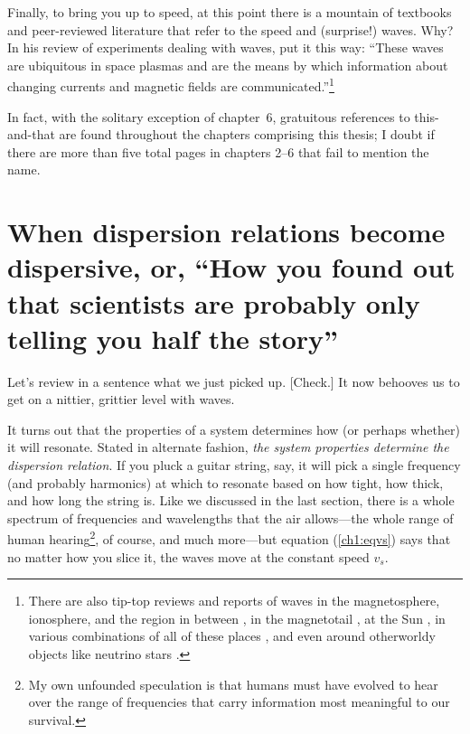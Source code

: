 Finally, to bring you up to speed, at this point there is a mountain
of textbooks and peer-reviewed literature that refer to the \Alf speed
and (surprise!) \Alf waves. Why? In his review of experiments dealing
with \Alf waves, \cite{Gekelman1999} put it this way: ``These waves
are ubiquitous in space plasmas and are the means by which information
about changing currents and magnetic fields are
communicated.''\footnote{There are also tip-top reviews and reports of
  \Alf waves in the magnetosphere, ionosphere, and the region in
  between \citep{Stasiewicz2000,Berthomier2011,Mottez2015}, in the
  magnetotail \citep{Keiling2009}, at the Sun
  \citep{Mathioudakis2013}, in various combinations of all of these
  places \citep{Wu2016a}, and even around otherworldy objects like
  neutrino stars \citep{Duncan1996}.} 

In fact, with the solitary exception of chapter~6, gratuitous
references to \Alf this-and-that are found throughout the chapters
comprising this thesis; I doubt if there are more than five total
pages in chapters 2--6 that fail to mention the name.

\section[When dispersion relations become dispersive]{When dispersion
  relations become dispersive, or, ``How
  you found out that scientists are probably only telling you half the
  story''}

Let's review in a sentence what we just picked up. [Check.] It now
behooves us to get on a nittier, grittier level with \Alf waves.

It turns out that the properties of a system determines how (or
perhaps whether) it will resonate. Stated in alternate fashion,
\emph{the system properties determine the dispersion relation}. If you
pluck a guitar string, say, it will pick a single frequency (and
probably harmonics) at which to resonate based on how tight, how
thick, and how long the string is. Like we discussed in the last
section, there is a whole spectrum of frequencies and wavelengths that
the air allows---the whole range of human hearing\footnote{My own
  unfounded speculation is that humans must have evolved to hear over
  the range of frequencies that carry information most meaningful to
  our survival.}, of course, and much more---but equation
(\ref{ch1:eqvs}) says that no matter how you slice it, the waves move
at the constant speed $v_s$. 


